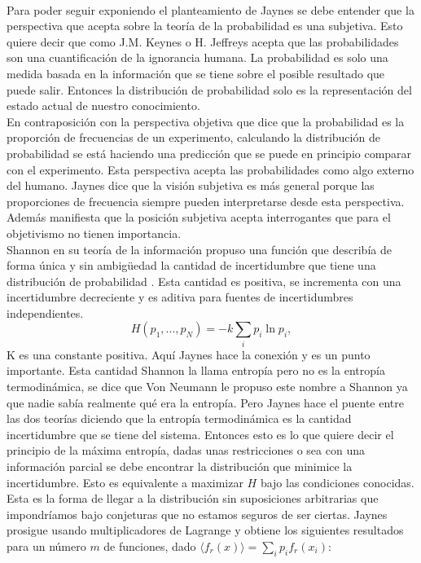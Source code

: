 \\
Para poder seguir exponiendo el planteamiento de Jaynes se debe entender que la perspectiva que acepta sobre la teoría de la probabilidad es una subjetiva. Esto quiere decir que como J.M. Keynes o H. Jeffreys acepta que las probabilidades son una cuantificación de la ignorancia humana. La probabilidad es solo una medida basada en la información que se tiene sobre el posible resultado que puede salir. Entonces la distribución de probabilidad solo es la representación del estado actual de nuestro conocimiento. \\
En contraposición con la perspectiva objetiva que dice que la probabilidad es la proporción de frecuencias de un experimento, calculando la distribución de probabilidad se está haciendo una predicción que se puede en principio comparar con el experimento. Esta perspectiva acepta las probabilidades como algo externo del humano. Jaynes dice que la visión subjetiva es más general porque las proporciones de frecuencia siempre pueden interpretarse desde esta perspectiva. Además manifiesta que la posición subjetiva acepta interrogantes que para el objetivismo no tienen importancia. 
\\
Shannon en su teoría de la información propuso una función que describía de forma única y sin ambigüedad la cantidad de incertidumbre que tiene una distribución de probabilidad \cite{ShannonInformation}. Esta cantidad es positiva, se incrementa con una incertidumbre decreciente y es aditiva para fuentes de incertidumbres independientes.
\begin{equation}
H(p_{1},...,p_{N})=-k \sum_{i} p_{i} \ln p_{i},
\end{equation}
K es una constante positiva. Aquí Jaynes hace la conexión y es un punto importante. Esta cantidad Shannon la llama entropía pero no es la entropía termodinámica, se dice que Von Neumann le propuso este nombre a Shannon ya que nadie sabía realmente qué era la entropía. Pero Jaynes hace el puente entre las dos teorías diciendo que la entropía termodinámica es la  cantidad incertidumbre que se tiene del sistema. Entonces esto es lo que quiere decir el principio de la máxima entropía, dadas unas restricciones o sea con una información parcial se debe encontrar la distribución que minimice la incertidumbre. Esto es equivalente a maximizar $H$ bajo las condiciones conocidas. Esta es la forma de llegar a la distribución sin suposiciones arbitrarias que impondríamos bajo conjeturas que no estamos seguros de ser ciertas. Jaynes prosigue usando multiplicadores de Lagrange y obtiene los siguientes resultados para un número $m$ de funciones, dado  $\langle f_{r}(x) \rangle = \sum_{i} p_{i} f_{r} (x_{i})$:
